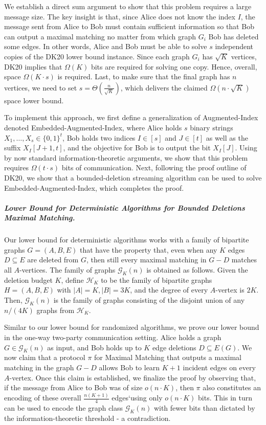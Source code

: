 \documentclass[11pt,a4paper]{article}
\begin{document}
We establish a direct sum argument to show that this problem requires a large message size. The key insight is that, since Alice does not know the index $I$, the message sent from Alice to Bob must contain sufficient information so that Bob can output a maximal matching no matter from which graph $G_i$ Bob has deleted some edges. In other words, Alice and Bob must be able to solve $s$ independent copies of the DK20 lower bound instance. Since each graph $G_i$ has $\sqrt{K}$ vertices, DK20 implies that $\Omega(K)$ bits are required for solving one copy. Hence, overall, space $\Omega(K \cdot s)$ is required. Last, to make sure that the final graph has $n$ vertices, we need to set $s = \Theta(\frac{n}{\sqrt{K}})$, which delivers the claimed $\Omega(n \cdot \sqrt{K})$ space lower bound.

To implement this approach, we first define a generalization of \textsf{Augmented-Index} denoted \textsf{Embedded-Augmented-Index}, where Alice holds $s$ binary strings $X_1, \dots, X_s \in \{0, 1\}^t$, Bob holds two indices $I \in [s]$ and $J \in [t]$ as well as the suffix $X_I[J+1, t]$, and the objective for Bob is to output the bit $X_I[J]$.
Using by now standard information-theoretic arguments, we show that this problem requires $\Omega(t \cdot s)$ bits of communication. Next, following the proof outline of DK20, we show that a bounded-deletion streaming algorithm can be used to solve \textsf{Embedded-Augmented-Index}, which completes the proof.



\subparagraph{Lower Bound for Deterministic Algorithms for Bounded Deletions \textsf{Maximal Matching}.}





Our lower bound for deterministic algorithms works with a family of bipartite graphs $G=(A, B, E)$ that have the property that, even when any $K$ edges $D \subseteq E$ are deleted from $G$, then still every maximal matching in $G - D$ matches all $A$-vertices. The family of graphs $\mathcal{G}_K(n)$ is obtained as follows. Given the deletion budget $K$, define $\mathcal{H}_K$ to be the family of bipartite graphs $H=(A, B, E)$ with $|A| = K, |B| = 3K$, and the degree of every $A$-vertex is $2K$. Then, $\mathcal{G}_K(n)$ is the family of graphs consisting of the disjoint union of any $n/(4K)$ graphs from $\mathcal{H}_K$. 

Similar to our lower bound for randomized algorithms, we prove our lower bound in the one-way two-party communication setting. Alice holds a graph $G \in \mathcal{G}_K(n)$ as input, and Bob holds up to $K$ edge deletions $D \subseteq E(G)$. We now claim that a protocol $\pi$ for \textsf{Maximal Matching} that outputs a maximal matching in the graph $G - D$ allows Bob to learn $K+1$ incident edges on every $A$-vertex. Once this claim is established, we finalize the proof by observing that, if the message from Alice to Bob was of size $o(n \cdot K)$, then $\pi$ also constitutes an encoding of these overall $\frac{n(K+1)}{4}$ edges`using only $o(n \cdot K)$ bits. This in turn can be used to encode the graph class $\mathcal{G}_K(n)$ with fewer bits than dictated by the information-theoretic threshold - a contradiction.
\end{document}
